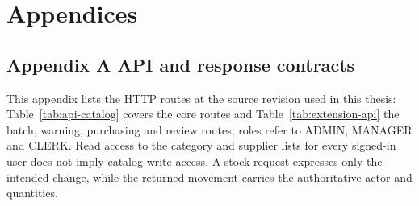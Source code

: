 \chapter*{Appendices}


\FloatBarrier

\section*{Appendix A API and response contracts}


This appendix lists the HTTP routes at the source revision used in this thesis: Table~\ref{tab:api-catalog} covers the core routes and Table~\ref{tab:extension-api} the batch, warning, purchasing and review routes; roles refer to ADMIN, MANAGER and CLERK. Read access to the category and supplier lists for every signed-in user does not imply catalog write access. A stock request expresses only the intended change, while the returned movement carries the authoritative actor and quantities.



